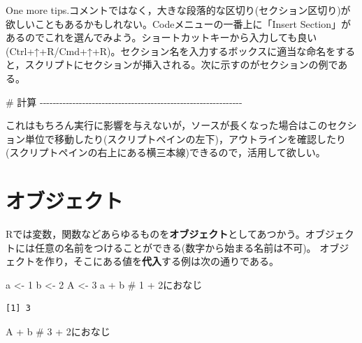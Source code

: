 \documentclass[
  a4paper,
]{ltjsbook}
\newenvironment{Shaded}{\begin{snugshade}}{\end{snugshade}}
\newcommand{\CommentTok}[1]{\textcolor[rgb]{0.37,0.37,0.37}{#1}}
\newcommand{\DecValTok}[1]{\textcolor[rgb]{0.68,0.00,0.00}{#1}}
\newcommand{\NormalTok}[1]{\textcolor[rgb]{0.00,0.23,0.31}{#1}}
\newcommand{\OtherTok}[1]{\textcolor[rgb]{0.00,0.23,0.31}{#1}}
\newcommand{\SpecialCharTok}[1]{\textcolor[rgb]{0.37,0.37,0.37}{#1}}
\begin{document}
One more
tips.コメントではなく，大きな段落的な区切り(セクション区切り)が欲しいこともあるかもしれない。Codeメニューの一番上に「Insert
Section」があるのでこれを選んでみよう。ショートカットキーから入力しても良い(Ctrl+↑+R/Cmd+↑+R)。セクション名を入力するボックスに適当な命名をすると，スクリプトにセクションが挿入される。次に示すのがセクションの例である。

\begin{Shaded}
\begin{Highlighting}[]
\CommentTok{\# 計算 {-}{-}{-}{-}{-}{-}{-}{-}{-}{-}{-}{-}{-}{-}{-}{-}{-}{-}{-}{-}{-}{-}{-}{-}{-}{-}{-}{-}{-}{-}{-}{-}{-}{-}{-}{-}{-}{-}{-}{-}{-}{-}{-}{-}{-}{-}{-}{-}{-}{-}{-}{-}{-}{-}{-}{-}{-}{-}{-}{-}{-}{-}}
\end{Highlighting}
\end{Shaded}

これはもちろん実行に影響を与えないが，ソースが長くなった場合はこのセクション単位で移動したり(スクリプトペインの左下)，アウトラインを確認したり(スクリプトペインの右上にある横三本線)できるので，活用して欲しい。

\section{オブジェクト}\label{ux30aaux30d6ux30b8ux30a7ux30afux30c8}

Rでは変数，関数などあらゆるものを\textbf{オブジェクト}としてあつかう。オブジェクトには任意の名前をつけることができる(数字から始まる名前は不可)。
オブジェクトを作り，そこにある値を\textbf{代入}する例は次の通りである。

\begin{Shaded}
\begin{Highlighting}[]
\NormalTok{a }\OtherTok{\textless{}{-}} \DecValTok{1}
\NormalTok{b }\OtherTok{\textless{}{-}} \DecValTok{2}
\NormalTok{A }\OtherTok{\textless{}{-}} \DecValTok{3}
\NormalTok{a }\SpecialCharTok{+}\NormalTok{ b }\CommentTok{\# 1 + 2におなじ}
\end{Highlighting}
\end{Shaded}

\begin{verbatim}
[1] 3
\end{verbatim}

\begin{Shaded}
\begin{Highlighting}[]
\NormalTok{A }\SpecialCharTok{+}\NormalTok{ b }\CommentTok{\# 3 + 2におなじ}
\end{Highlighting}
\end{Shaded}
\end{document}
